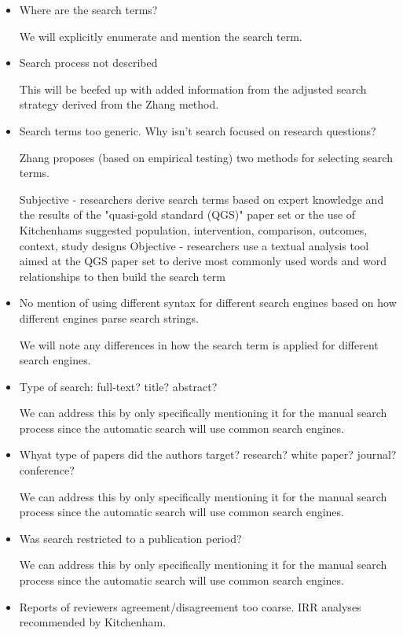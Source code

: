 \begin{itemize}
\item Where are the search terms?

We will explicitly enumerate and mention the search term.

\item Search process not described

This will be beefed up with added information from the adjusted search strategy derived from the Zhang method.

\item Search terms too generic. Why isn't search focused on research questions?

Zhang \cite{zhang2011identifying} proposes (based on empirical testing) two methods for selecting search terms.

Subjective - researchers derive search terms based on expert knowledge and the results of the "quasi-gold standard (QGS)" paper set or the use of Kitchenhams suggested population, intervention, comparison, outcomes, context, study designs
Objective - researchers use a textual analysis tool aimed at the QGS paper set to derive most commonly used words and word relationships to then build the search term

\item No mention of using different syntax for different search engines based on how different engines parse search strings.

We will note any differences in how the search term is applied for different search engines.

\item Type of search: full-text? title? abstract?

We can address this by only specifically mentioning it for the manual search process since the automatic search will use common search engines.

\item Whyat type of papers did the authors target? research? white paper? journal? conference?

We can address this by only specifically mentioning it for the manual search process since the automatic search will use common search engines.

\item Was search restricted to a publication period?

We can address this by only specifically mentioning it for the manual search process since the automatic search will use common search engines.

\item Reports of reviewers agreement/disagreement too coarse. IRR analyses recommended by Kitchenham.


\end{itemize}
